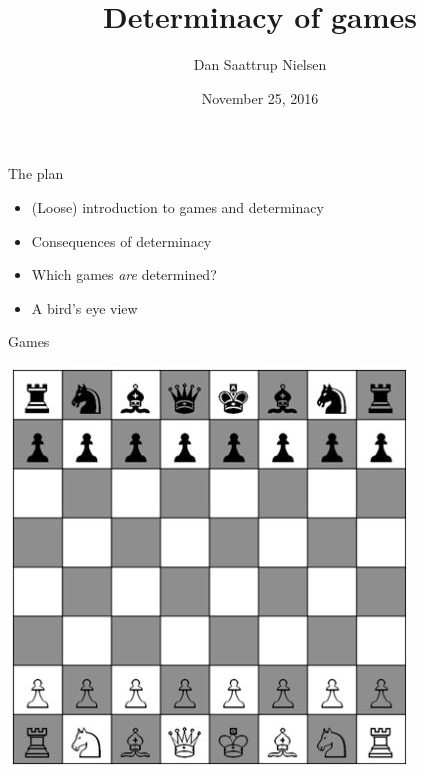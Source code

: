 \documentclass{beamer}
\title[Determinacy]{Determinacy of games}
\author{Dan Saattrup Nielsen}
\date{November 25, 2016}
\begin{document}
{

\begin{frame}
	\maketitle
\end{frame}}

\begin{frame}{The plan}
	\begin{itemize}
		\item\pause (Loose) introduction to games and determinacy
		\item\pause Consequences of determinacy
		\item\pause Which games \textit{are} determined?
		\item\pause A bird's eye view
	\end{itemize}
\end{frame}

\begin{frame}{Games}
	\begin{center}
		\includegraphics[scale=0.45]{chess.jpg}
	\end{center}
\end{frame}
\end{document}
